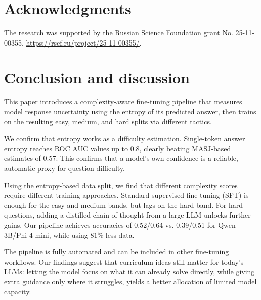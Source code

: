 \section{Acknowledgments}

The research was supported by the Russian Science Foundation grant No. 25-11-00355, \url{https://rscf.ru/project/25-11-00355/}. 

\section{Conclusion and discussion}

This paper introduces a complexity-aware fine-tuning pipeline that measures model response uncertainty using the entropy of its predicted answer, then trains on the resulting easy, medium, and hard splits via different tactics.

We confirm that entropy works as a difficulty estimation. Single-token answer entropy reaches ROC AUC values up to $0.8$, clearly beating MASJ-based estimates of $0.57$. 
This confirms that a model's own confidence is a reliable, automatic proxy for question difficulty.

Using the entropy-based data split, we find that different complexity scores require different training approaches. Standard supervised fine-tuning (SFT) is enough for the easy and medium bands, but lags on the hard band. For hard questions, adding a distilled chain of thought from a large LLM unlocks further gains. Our pipeline achieves accuracies of 0.52/0.64 vs. 0.39/0.51 for Qwen 3B/Phi-4-mini, while using $81\%$ less data.

The pipeline is fully automated and can be included in other fine-tuning workflows. Our findings suggest that curriculum ideas still matter for today's LLMs: letting the model focus on what it can already solve directly, while giving extra guidance only where it struggles, yields a better allocation of limited model capacity.



